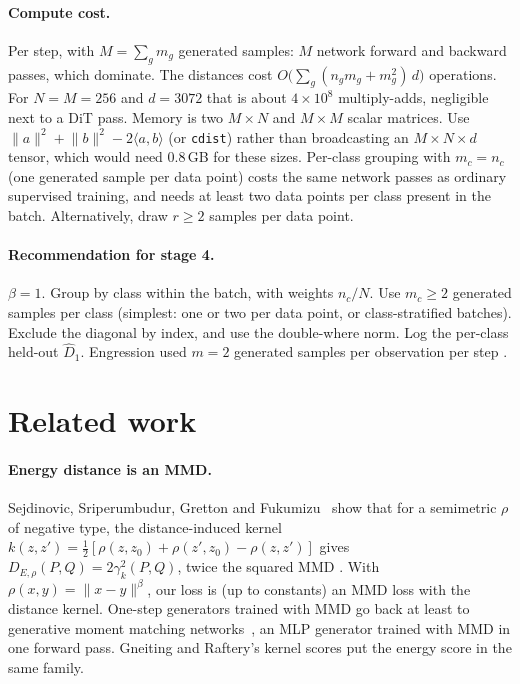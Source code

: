 \documentclass[11pt]{article}
\theoremstyle{definition}
\theoremstyle{remark}
\newcommand{\norm}[1]{\lVert #1\rVert}
\newcommand{\ip}[2]{\langle #1, #2\rangle}
\begin{document}
\paragraph{Compute cost.} Per step, with $M=\sum_gm_g$ generated samples: $M$ network forward and backward
passes, which dominate. The distances cost $O\big(\sum_g(n_gm_g+m_g^2)\,d\big)$ operations. For $N=M=256$ and
$d=3072$ that is about $4\times10^8$ multiply-adds, negligible next to a DiT pass. Memory is two
$M\times N$ and $M\times M$ scalar matrices. Use $\norm a^2+\norm b^2-2\ip ab$ (or \texttt{cdist}) rather than
broadcasting an $M\times N\times d$ tensor, which would need 0.8\,GB for these sizes. Per-class grouping with
$m_c=n_c$ (one generated sample per data point) costs the same network passes as ordinary supervised training,
and needs at least two data points per class present in the batch. Alternatively, draw $r\ge2$ samples per
data point.

\paragraph{Recommendation for stage 4.} $\beta=1$. Group by class within the batch, with weights $n_c/N$.
Use $m_c\ge2$ generated samples per class (simplest: one or two per data point, or class-stratified
batches). Exclude the diagonal by index, and use the double-where norm. Log the per-class held-out
$\widehat D_1$. Engression used $m=2$ generated samples per observation per step \cite[App.~E]{SM2025}.

\section{Related work}\label{sec:related}
\paragraph{Energy distance is an MMD.} Sejdinovic, Sriperumbudur, Gretton and Fukumizu~\cite{Sejdinovic2013}
show that for a semimetric $\rho$ of negative type, the distance-induced kernel
$k(z,z')=\tfrac12[\rho(z,z_0)+\rho(z',z_0)-\rho(z,z')]$ \cite[Def.~13]{Sejdinovic2013} gives
$D_{E,\rho}(P,Q)=2\gamma_k^2(P,Q)$, twice the squared MMD \cite[Thm.~22]{Sejdinovic2013}. With
$\rho(x,y)=\norm{x-y}^\beta$, our loss is (up to constants) an MMD loss with the distance kernel. One-step
generators trained with MMD go back at least to generative moment matching networks~\cite{Li2015}, an MLP
generator trained with MMD in one forward pass. Gneiting and Raftery's kernel scores \cite[Sec.~5.1,
Thm.~4, Ex.~9]{GR2007} put the energy score in the same family.
\end{document}
